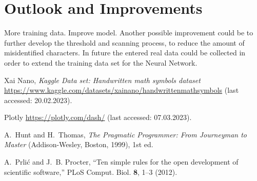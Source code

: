 \documentclass[@CLASSOPTIONS@]{tumarticle}
\begin{document}
\section{Outlook and Improvements}

More training data.
Improve model.
Another possible improvement could be to further develop the threshold and scanning process,
to reduce the amount of misidentified characters.
In future the entered real data could be collected in order to extend the training data set for the
Neural Network.

\begin{thebibliography}{10}
  \newcommand{\enquote}[1]{``#1''}

  Xai Nano, \emph{Kaggle Data set: Handwritten math symbols dataset}
  \url{https://www.kaggle.com/datasets/xainano/handwrittenmathsymbols}
  (last accessed: 20.02.2023).

  Plotly \url{https://plotly.com/dash/}
  (last accessed: 07.03.2023).

  A.~Hunt and H.~Thomas, \emph{The Pragmatic Programmer: From Journeyman to
    Master} (Addison-Wesley, Boston, 1999), 1st ed.

  A.~Prli{\'c} and J.~B. Procter, \enquote{Ten simple rules for the open
    development of scientific software,} PLoS Comput. Biol. \textbf{8}, 1--3
  (2012).

\end{thebibliography}
\end{document}
